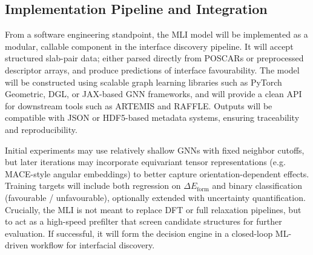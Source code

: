 \newpage \subsection*{Implementation Pipeline and Integration}

From a software engineering standpoint, the MLI model will be implemented as a modular, callable component in the interface discovery pipeline.
It will accept structured slab-pair data; either parsed directly from POSCARs or preprocessed descriptor arrays, and produce predictions of interface favourability.
The model will be constructed using scalable graph learning libraries such as PyTorch Geometric, DGL, or JAX-based GNN frameworks, and will provide a clean API for downstream tools such as ARTEMIS and RAFFLE. Outputs will be compatible with JSON or HDF5-based metadata systems, ensuring traceability and reproducibility.

Initial experiments may use relatively shallow GNNs with fixed neighbor cutoffs, but later iterations may incorporate equivariant tensor representations (e.g. MACE-style angular embeddings) to better capture orientation-dependent effects.
Training targets will include both regression on $\Delta E_\mathrm{form}$ and binary classification (favourable / unfavourable), optionally extended with uncertainty quantification.
Crucially, the MLI is not meant to replace DFT or full relaxation pipelines, but to act as a high-speed prefilter that screen candidate structures for further evaluation.
If successful, it will form the decision engine in a closed-loop ML-driven workflow for interfacial discovery.
